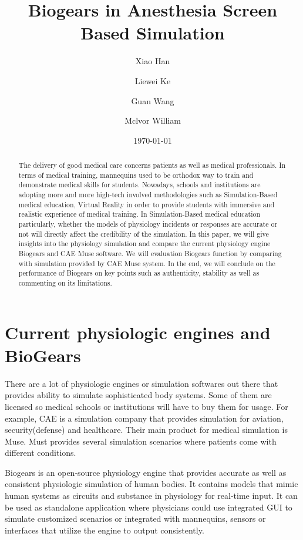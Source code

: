 \documentclass[a4paper]{article}
\title{Biogears in Anesthesia Screen Based Simulation}
\author{
  Xiao Han\\
  \and Liewei Ke
  \and Guan Wang
  \and Mclvor William
}
\date{\today}
\begin{document}
\maketitle

\begin{abstract}
The delivery of good medical care concerns patients as well as medical professionals. In terms of medical training, mannequins used to be orthodox way to train and demonstrate medical skills for students. Nowadays, schools and institutions are adopting more and more high-tech involved methodologies such as Simulation-Based medical education, Virtual Reality in order to provide students with immersive and realistic experience of medical training. In Simulation-Based medical education particularly, whether the models of physiology incidents or responses are accurate or not will directly affect the credibility of the simulation. In this paper, we will give insights into the physiology simulation and compare the current physiology engine Biogears and CAE Muse software. We will evaluation Biogears function by comparing with simulation provided by CAE Muse system. In the end, we will conclude on the performance of Biogears on key points such as authenticity, stability as well as commenting on its limitations.
\end{abstract}

\section{Current physiologic engines and BioGears}
There are a lot of physiologic engines or simulation softwares out there that provides ability to simulate sophisticated body systems. Some of them are licensed so medical schools or institutions will have to buy them for usage. For example, CAE is a simulation company that provides simulation for aviation, security(defense) and healthcare. Their main product for medical simulation is Muse. Must provides several simulation scenarios where patients come with different conditions.

Biogears is an open-source physiology engine that provides accurate as well as consistent physiologic simulation of human bodies. It contains models that mimic human systems as circuits and substance in physiology for real-time input. It can be used as standalone application where physicians could use integrated GUI to simulate customized scenarios or integrated with mannequins, sensors or interfaces that utilize the engine to output consistently.
\end{document}

